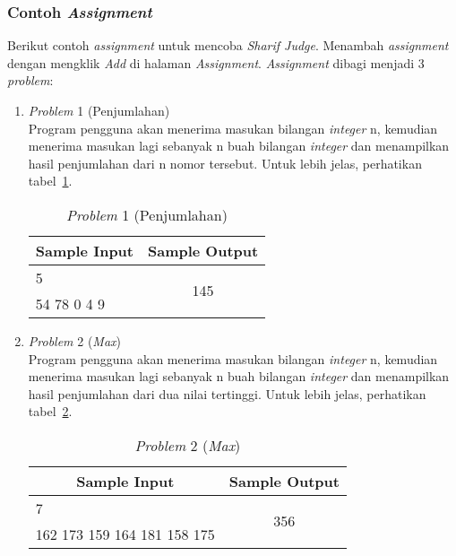 \subsubsection{Contoh \textit{Assignment}}

Berikut contoh \textit{assignment} untuk mencoba \textit{Sharif Judge}. Menambah \textit{assignment} dengan mengklik \textit{Add} di halaman \textit{Assignment}. \textit{Assignment} dibagi menjadi 3 \textit{problem}:
\begin{enumerate}
	\item \textit{Problem} 1 (Penjumlahan) \\
	Program pengguna akan menerima masukan bilangan \textit{integer} n, kemudian menerima masukan lagi sebanyak n buah bilangan \textit{integer} dan menampilkan hasil penjumlahan dari n nomor tersebut. Untuk lebih jelas, perhatikan tabel~\ref{tab:tablesum}.
	
	\begin{table}[H] %
		\centering 
		\caption{\textit{Problem} 1 (Penjumlahan)}
		\label{tab:tablesum}
		\begin{tabular}{|c|c|}
			\hline
			Sample Input & Sample Output\\
			
			\hline
			\multicolumn{1}{|l|}{5} & \multirow{2}{*}{145}\\
			\multicolumn{1}{|l|}{54 78 0 4 9} & \\
			
			\hline
			
		\end{tabular} 
	\end{table}
	
	\item \textit{Problem} 2 (\textit{Max}) \\
	Program pengguna akan menerima masukan bilangan \textit{integer} n, kemudian menerima masukan lagi sebanyak n buah bilangan \textit{integer} dan menampilkan hasil penjumlahan dari dua nilai tertinggi. Untuk lebih jelas, perhatikan tabel~\ref{tab:tablemax}.
	
	\begin{table}[H] %
		\centering 
		\caption{\textit{Problem} 2 (\textit{Max})}
		\label{tab:tablemax}
		\begin{tabular}{|c|c|}
			\hline
			Sample Input & Sample Output\\
			
			\hline
			\multicolumn{1}{|l|}{7} & \multirow{2}{*}{356}\\
			\multicolumn{1}{|l|}{162 173 159 164 181 158 175} & \\
			

\end{tabular}
\end{table}
\end{enumerate}
